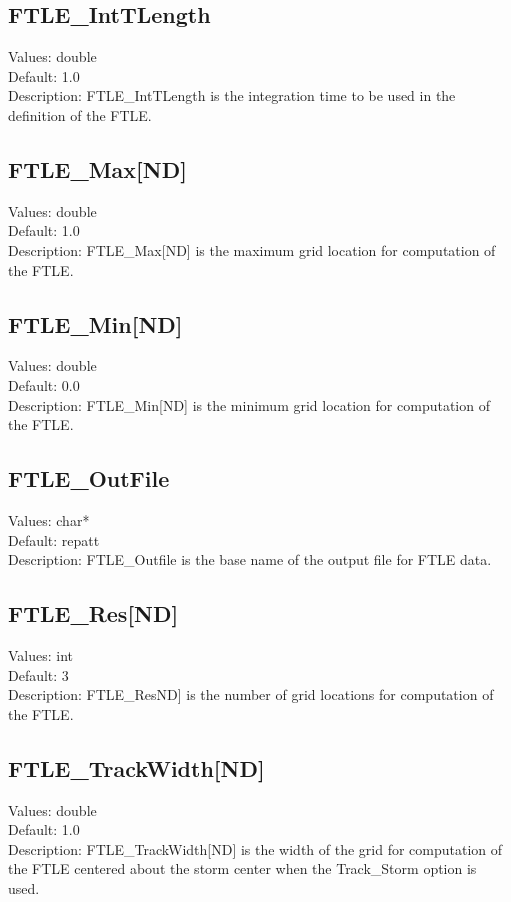 \documentclass[11pt]{article}
\begin{document}
\subsection{FTLE\_IntTLength}
Values:   double \\
Default:  1.0\\
Description:  FTLE\_IntTLength is the integration time to be used in the definition of the FTLE.

\subsection{FTLE\_Max[ND]}
Values:   double \\
Default:  1.0\\
Description:   FTLE\_Max[ND] is the maximum grid location for computation of the FTLE.

\subsection{FTLE\_Min[ND]}
Values:   double \\
Default:  0.0\\
Description:  FTLE\_Min[ND] is the minimum grid location for computation of the FTLE.

\subsection{FTLE\_OutFile}
Values:   char* \\
Default:  repatt\\
Description:   FTLE\_Outfile is the base name of the output file for FTLE data.

\subsection{FTLE\_Res[ND]}
Values:   int \\
Default:  3\\
Description:  FTLE\_ResND] is the number of grid locations for computation of the FTLE.

\subsection{FTLE\_TrackWidth[ND]}
Values:   double \\
Default:  1.0\\
Description:  FTLE\_TrackWidth[ND] is the width of the grid for computation of the FTLE centered about the storm center when the Track\_Storm option is used.
\end{document}
